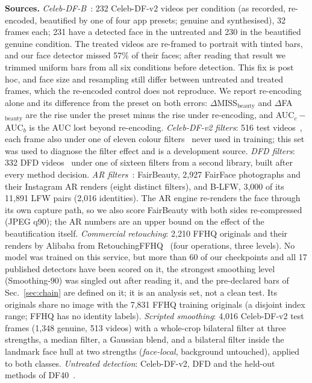 \documentclass[conference]{IEEEtran}
\begin{document}
\textbf{Sources.} \emph{Celeb-DF-B}~\cite{libourel2024}: 232 Celeb-DF-v2 videos per condition (as recorded, re-encoded,
beautified by one of four app presets; genuine and synthesised), 32 frames each; 231 have a detected face in the untreated
and 230 in the beautified genuine condition. The treated videos are re-framed to portrait with tinted bars, and our face
detector missed 57\% of their faces; after reading that result we trimmed uniform bars from all six conditions before
detection. This fix is post hoc, and face size and resampling still differ between untreated and treated frames, which the
re-encoded control does not reproduce. We report re-encoding alone and its difference from the preset on both errors:
$\Delta$MISS$_\text{beauty}$ and $\Delta$FA$_\text{beauty}$ are the rise under the preset minus the rise under re-encoding,
and AUC$_c{-}$AUC$_b$ is the AUC lost beyond re-encoding. \emph{Celeb-DF-v2 filters}: 516 test videos~\cite{celebdf}, each
frame also under one of eleven colour filters~\cite{pilgram} never used in training; this set was used to diagnose the filter
effect and is a development source. \emph{DFD filters}: 332 DFD videos~\cite{dfd} under one of sixteen filters from a second
library, built after every method decision. \emph{AR filters}~\cite{openfilter2022}: FairBeauty, 2,927 FairFace photographs and
their Instagram AR renders (eight distinct filters), and B-LFW, 3,000 of its 11,891 LFW pairs (2,016 identities). The AR engine
re-renders the face through its own capture path, so we also score FairBeauty with both sides re-compressed (JPEG q90); the AR
numbers are an upper bound on the effect of the beautification itself. \emph{Commercial retouching}: 2,210 FFHQ originals and
their renders by Alibaba from RetouchingFFHQ~\cite{retouchingffhq} (four operations, three levels). No model was trained on
this service, but more than 60 of our checkpoints and all 17 published detectors have been scored on it, the strongest
smoothing level (Smoothing-90) was singled out after reading it, and the pre-declared bars of Sec.~\ref{sec:chain} are defined
on it; it is an analysis set, not a clean test. Its originals share no image with the 7,831 FFHQ training originals (a
disjoint index range; FFHQ has no identity labels). \emph{Scripted smoothing}: 4,016 Celeb-DF-v2 test frames (1,348 genuine,
513 videos) with a whole-crop bilateral filter at three strengths, a median filter, a Gaussian blend, and a bilateral filter
inside the landmark face hull at two strengths (\emph{face-local}, background untouched), applied to both classes.
\emph{Untreated detection}: Celeb-DF-v2, DFD and the held-out methods of DF40~\cite{df40}.
\end{document}

